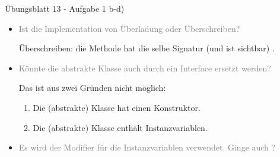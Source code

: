\begin{frame}[c,fragile]{Übungsblatt 13 - Aufgabe 1 b-d)}
\small\begin{itemize}[<+(1)->]
    \itemsep5.5pt
    \item \textcolor{gray}{Ist die Implementation von  Überladung oder Überschreiben?}\par\pause
    Überschreiben: die  Methode hat die selbe Signatur (und ist sichtbar) .
    \item \textcolor{gray}{Könnte die abstrakte Klasse auch durch ein Interface ersetzt werden?}\par
    \pause Das ist aus zwei Gründen nicht möglich: \begin{enumerate}
        \item<6-> Die (abstrakte) Klasse hat einen Konstruktor.
        \item<7-> Die (abstrakte) Klasse enthält Instanzvariablen.
    \end{enumerate}
    \item<9-> \textcolor{gray}{Es wird der Modifier  für die Instanzvariablen verwendet. Ginge auch ?}\par
\end{itemize}
\end{frame}

